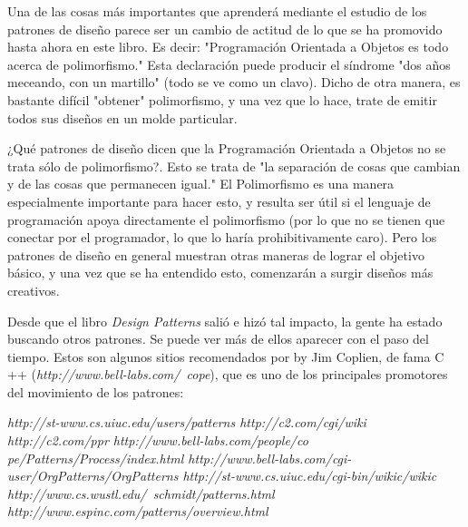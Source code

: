 Una de las cosas más importantes que aprenderá mediante el estudio de los patrones de diseño parece ser  un cambio de actitud de lo que se ha promovido hasta ahora en este libro. Es decir: "Programación Orientada a Objetos es todo acerca de polimorfismo." Esta declaración puede producir el síndrome "dos años meceando, con un martillo"  (todo se ve como un clavo). Dicho de otra manera, es bastante difícil "obtener" polimorfismo, y una vez que lo hace, trate de emitir  %
todos sus diseños en un molde particular.\newline

¿Qué patrones de diseño dicen que la Programación Orientada a Objetos no se trata sólo de polimorfismo?. Esto se trata de "la separación de cosas que cambian y de las cosas que permanecen igual." El Polimorfismo es una manera especialmente importante para hacer esto, y resulta ser útil si el lenguaje de programación apoya directamente el polimorfismo (por lo que no se tienen que conectar por el programador, lo que lo haría prohibitivamente caro). Pero los patrones de diseño en general muestran otras maneras de lograr el objetivo básico, y una vez que se ha entendido esto, comenzarán a surgir diseños más creativos.\newline

Desde que el libro \textit{Design Patterns} salió e hizó tal impacto, la gente ha estado buscando otros patrones. Se puede ver más de ellos aparecer con el paso del tiempo. Estos son algunos sitios recomendados por by Jim Coplien, de fama C ++ (\textit{http://www.bell-labs.com/~cope}), que es uno de los principales promotores del movimiento de los patrones:      \newline

\textit{http://st-www.cs.uiuc.edu/users/patterns \newline
http://c2.com/cgi/wiki \newline
http://c2.com/ppr  \newline
http://www.bell-labs.com/people/co \newline
pe/Patterns/Process/index.html  \newline
http://www.bell-labs.com/cgi-user/OrgPatterns/OrgPatterns  \newline
http://st-www.cs.uiuc.edu/cgi-bin/wikic/wikic  \newline
http://www.cs.wustl.edu/~schmidt/patterns.html  \newline
http://www.espinc.com/patterns/overview.html } \newline

